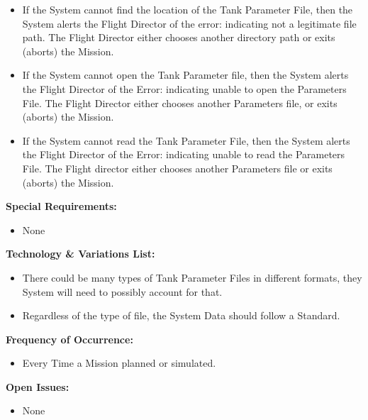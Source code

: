 \documentclass[letterpaper]{article}
\begin{document}
\begin{itemize}
   \item[2a,3a]If the System cannot find the location of the Tank 
      Parameter File, then the System alerts the Flight Director of 
      the error:  indicating not a legitimate file path.  The Flight 
      Director either chooses another directory path or exits 
      (aborts) the Mission.
   \item[4a]If the System cannot open the Tank Parameter file, then 
      the System alerts the Flight Director of the Error:  indicating
      unable to open the Parameters File.  The Flight Director either
      chooses another Parameters file, or exits (aborts) the Mission.
   \item[5a]If the System cannot read the Tank Parameter File, then
      the System alerts the Flight Director of the Error:  indicating
      unable to read the Parameters File.  The Flight director either
      chooses another Parameters file or exits (aborts) the Mission.
\end{itemize}
\textbf{Special Requirements:}
\begin{itemize}
   \item None
\end{itemize}
\textbf{Technology \& Variations List:}
\begin{itemize}
   \item There could be many types of Tank Parameter Files in different
      formats, they System will need to possibly account for that.
   \item Regardless of the type of file, the System Data should follow
      a Standard.
\end{itemize}
\textbf{Frequency of Occurrence:}
\begin{itemize}
   \item Every Time a Mission planned or simulated.
\end{itemize}
\textbf{Open Issues:}
\begin{itemize}
   \item None
\end{itemize}
\end{document}
